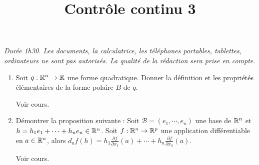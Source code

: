 \documentclass[a4paper]{tp_um}
\title{\large \sffamily\bfseries Contrôle continu 3}
\begin{document}
\maketitle
\textit{Durée 1h30. Les documents, la calculatrice, les téléphones portables, tablettes, ordinateurs ne sont pas autorisés. La qualité de la rédaction sera prise en compte.} 

\bigskip
\bigskip

\begin{enumerate}
	\item Soit $q:\mathbb{R}^n \to\mathbb{R}$ une forme quadratique. Donner la définition et les propriétés élémentaires de la forme polaire $B$ de $q$.

\bigskip

Voir cours.

\bigskip

	\item Démontrer la proposition suivante : Soit $\mathcal B = (e_1 ,\cdots , e_n )$ une base de $\mathbb{R}^n$ et $h = h_1 e_1 + \cdots + h_n e_n \in \mathbb{R}^n$. Soit $f : \mathbb{R}^n \to\mathbb{R}^p$ une application différentiable en $a \in \mathbb{R}^n$, alors $d_a f (h) = h_1 \frac{\partial f}{\partial x_1}(a) + \cdots+ h_n \frac{\partial f}{\partial x_n}(a)$.

		\bigskip

Voir cours.

\end{enumerate}
\end{document}
